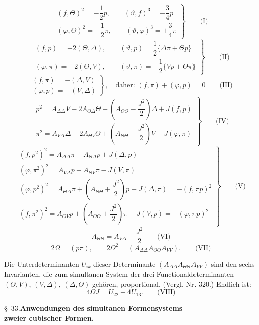 \documentclass[11pt]{article}
\let\Delta\varDelta
\let\Theta\varTheta
\let\Omega\varOmega
\begin{document}
\[
\left.\begin{array}{l}
(f,\Theta)^2=-\dfrac{1}{2}p,\qquad (\vartheta,f)^3=-\dfrac{3}{4}p\\[6pt]
(\varphi,\Theta)^2=-\dfrac{1}{2}\pi,\qquad (\vartheta,\varphi)^3=+\dfrac{3}{4}\pi
\end{array}\right\}\qquad\text{(I)}
\]
\[
\left.\begin{array}{l}
(f,p)=-2(\Theta,\Delta),\qquad (\vartheta,p)=\dfrac{1}{2}\{\Delta\pi+\Theta p\}\\[6pt]
(\varphi,\pi)=-2(\Theta,V),\qquad (\vartheta,\pi)=-\dfrac{1}{2}\{Vp+\Theta\pi\}
\end{array}\right\}\qquad\text{(II)}
\]
\[
\left.\begin{array}{l}
(f,\pi)=-(\Delta,V)\\
(\varphi,p)=-(V,\Delta)
\end{array}\right\},\quad\text{daher: }(f,\pi)+(\varphi,p)=0\qquad\text{(III)}
\]
\[
\left.\begin{array}{l}
p^2=A_{\Delta\Delta}V-2A_{\Theta\Delta}\Theta+\left(A_{\Theta\Theta}-\dfrac{J^2}{2}\right)\Delta+J(f,p)\\[6pt]
\pi^2=A_{V\Delta}\Delta-2A_{\Theta V}\Theta+\left(A_{\Theta\Theta}-\dfrac{J^2}{2}\right)V-J(\varphi,\pi)
\end{array}\right\}\qquad\text{(IV)}
\]
\[
\left.\begin{array}{l}
(f,p^2)^2=A_{\Delta\Delta}\pi+A_{\Theta\Delta}p+J(\Delta,p)\\
(\varphi,\pi^2)^2=A_{V\Delta}p+A_{\Theta V}\pi-J(V,\pi)\\
(\varphi,p^2)^2=A_{\Theta\Delta}\pi+\left(A_{\Theta\Theta}+\dfrac{J^2}{2}\right)p+J(\Delta,\pi)=-(f,\pi p)^2\\
(f,\pi^2)^2=A_{\Theta V}p+\left(A_{\Theta\Theta}+\dfrac{J^2}{2}\right)\pi-J(V,p)=-(\varphi,\pi p)^2
\end{array}\right\}\qquad\text{(V)}
\]
\[
A_{\Theta\Theta}=A_{V\Delta}-\dfrac{J^2}{2}\qquad\text{(VI)}
\]
\[
2\Omega=(p\pi),\qquad 2\Omega^2=(A_{\Delta\Delta}A_{\Theta\Theta}A_{VV}).\qquad\text{(VII)}
\]

Die Unterdeterminanten $U_{ik}$ dieser Determinante
$(A_{\Delta\Delta}A_{\Theta\Theta}A_{VV})$ sind den sechs Invarianten,
die zum simultanen System der drei Functionaldeterminanten $(\Theta,V)$,
$(V,\Delta)$, $(\Delta,\Theta)$ gehören, proportional. (Vergl. Nr. 320.)
Endlich ist:
\[
4\Omega J=U_{22}-4U_{13}.\qquad\text{(VIII)}
\]

\begin{center}
\S\ 33.\quad\textbf{Anwendungen des simultanen Formensystems\\
zweier cubischer Formen.}
\end{center}
\end{document}
